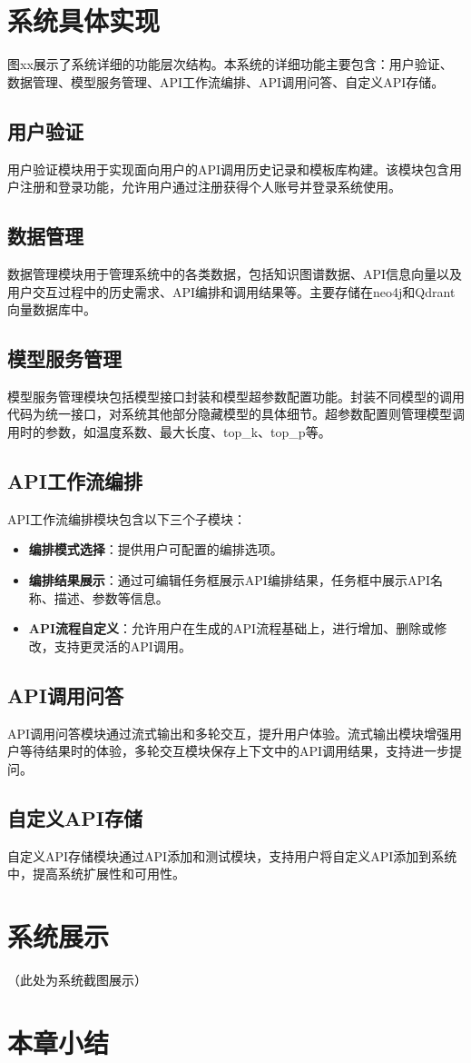 \section{系统具体实现}
图xx展示了系统详细的功能层次结构。本系统的详细功能主要包含：用户验证、数据管理、模型服务管理、API工作流编排、API调用问答、自定义API存储。

\subsection{用户验证}
用户验证模块用于实现面向用户的API调用历史记录和模板库构建。该模块包含用户注册和登录功能，允许用户通过注册获得个人账号并登录系统使用。

\subsection{数据管理}
数据管理模块用于管理系统中的各类数据，包括知识图谱数据、API信息向量以及用户交互过程中的历史需求、API编排和调用结果等。主要存储在neo4j和Qdrant向量数据库中。

\subsection{模型服务管理}
模型服务管理模块包括模型接口封装和模型超参数配置功能。封装不同模型的调用代码为统一接口，对系统其他部分隐藏模型的具体细节。超参数配置则管理模型调用时的参数，如温度系数、最大长度、top\_k、top\_p等。

\subsection{API工作流编排}
API工作流编排模块包含以下三个子模块：
\begin{itemize}
    \item \textbf{编排模式选择}：提供用户可配置的编排选项。
    \item \textbf{编排结果展示}：通过可编辑任务框展示API编排结果，任务框中展示API名称、描述、参数等信息。
    \item \textbf{API流程自定义}：允许用户在生成的API流程基础上，进行增加、删除或修改，支持更灵活的API调用。
\end{itemize}

\subsection{API调用问答}
API调用问答模块通过流式输出和多轮交互，提升用户体验。流式输出模块增强用户等待结果时的体验，多轮交互模块保存上下文中的API调用结果，支持进一步提问。

\subsection{自定义API存储}
自定义API存储模块通过API添加和测试模块，支持用户将自定义API添加到系统中，提高系统扩展性和可用性。

\section{系统展示}
（此处为系统截图展示）

\section{本章小结}